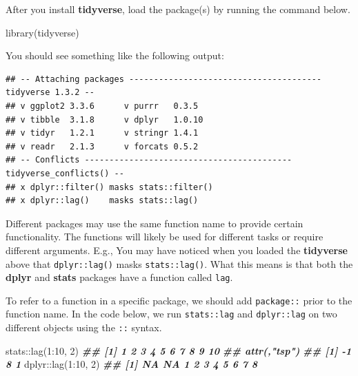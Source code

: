 \documentclass[
]{book}
\newenvironment{Shaded}{\begin{snugshade}}{\end{snugshade}}
\newcommand{\DecValTok}[1]{\textcolor[rgb]{0.00,0.00,0.81}{#1}}
\newcommand{\DocumentationTok}[1]{\textcolor[rgb]{0.56,0.35,0.01}{\textbf{\textit{#1}}}}
\newcommand{\FunctionTok}[1]{\textcolor[rgb]{0.00,0.00,0.00}{#1}}
\newcommand{\NormalTok}[1]{#1}
\newcommand{\SpecialCharTok}[1]{\textcolor[rgb]{0.00,0.00,0.00}{#1}}
\theoremstyle{definition}
\theoremstyle{definition}
\theoremstyle{definition}
\theoremstyle{definition}
\theoremstyle{remark}
\begin{document}
\begin{yourturn}
After you install \textbf{tidyverse}, load the package(s) by running the command below.

\begin{Shaded}
\begin{Highlighting}[]
\FunctionTok{library}\NormalTok{(tidyverse)}
\end{Highlighting}
\end{Shaded}

You should see something like the following output:

\begin{verbatim}
## -- Attaching packages --------------------------------------- tidyverse 1.3.2 --
## v ggplot2 3.3.6      v purrr   0.3.5 
## v tibble  3.1.8      v dplyr   1.0.10
## v tidyr   1.2.1      v stringr 1.4.1 
## v readr   2.1.3      v forcats 0.5.2 
## -- Conflicts ------------------------------------------ tidyverse_conflicts() --
## x dplyr::filter() masks stats::filter()
## x dplyr::lag()    masks stats::lag()
\end{verbatim}

\end{yourturn}

Different packages may use the same function name to provide certain functionality. The functions will likely be used for different tasks or require different arguments. E.g., You may have noticed when you loaded the \textbf{tidyverse} above that \texttt{dplyr::lag()} masks \texttt{stats::lag()}. What this means is that both the \textbf{dplyr} and \textbf{stats} packages have a function called \texttt{lag}.

To refer to a function in a specific package, we should add \texttt{package::} prior to the function name. In the code below, we run \texttt{stats::lag} and \texttt{dplyr::lag} on two different objects using the \texttt{::} syntax.

\begin{Shaded}
\begin{Highlighting}[]
\NormalTok{stats}\SpecialCharTok{::}\FunctionTok{lag}\NormalTok{(}\DecValTok{1}\SpecialCharTok{:}\DecValTok{10}\NormalTok{, }\DecValTok{2}\NormalTok{)}
\DocumentationTok{\#\#  [1]  1  2  3  4  5  6  7  8  9 10}
\DocumentationTok{\#\# attr(,"tsp")}
\DocumentationTok{\#\# [1] {-}1  8  1}
\NormalTok{dplyr}\SpecialCharTok{::}\FunctionTok{lag}\NormalTok{(}\DecValTok{1}\SpecialCharTok{:}\DecValTok{10}\NormalTok{, }\DecValTok{2}\NormalTok{)}
\DocumentationTok{\#\#  [1] NA NA  1  2  3  4  5  6  7  8}
\end{Highlighting}
\end{Shaded}
\end{document}
